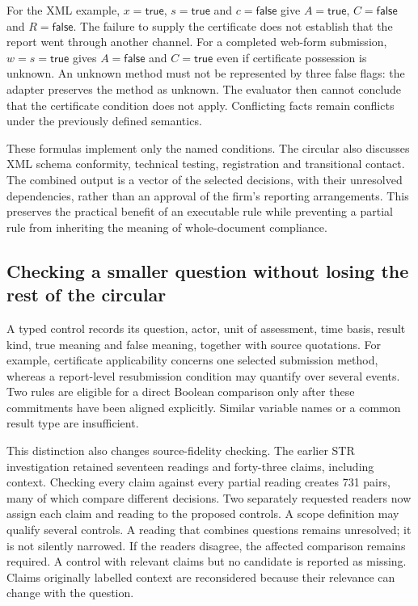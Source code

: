 For the XML example, $x=\mathsf{true}$, $s=\mathsf{true}$ and
$c=\mathsf{false}$ give $A=\mathsf{true}$, $C=\mathsf{false}$ and
$R=\mathsf{false}$. The failure to supply the certificate does not establish
that the report went through another channel. For a completed web-form
submission, $w=s=\mathsf{true}$ gives $A=\mathsf{false}$ and
$C=\mathsf{true}$ even if certificate possession is unknown. An unknown method
must not be represented by three false flags: the adapter preserves the method
as unknown. The evaluator then cannot conclude that the certificate condition
does not apply. Conflicting facts remain conflicts under the previously defined
semantics.

These formulas implement only the named conditions. The circular also discusses
XML schema conformity, technical testing, registration and transitional contact.
The combined output is a vector of the selected decisions, with their unresolved
dependencies, rather than an approval of the firm's reporting arrangements.
This preserves the practical benefit of an executable rule while preventing a
partial rule from inheriting the meaning of whole-document compliance.

\subsection{Checking a smaller question without losing the rest of the circular}

A typed control records its question, actor, unit of assessment, time basis,
result kind, true meaning and false meaning, together with source quotations.
For example, certificate applicability concerns one selected submission method,
whereas a report-level resubmission condition may quantify over several events.
Two rules are eligible for a direct Boolean comparison only after these
commitments have been aligned explicitly. Similar variable names or a common
result type are insufficient.

This distinction also changes source-fidelity checking. The earlier STR
investigation retained seventeen readings and forty-three claims, including
context. Checking every claim against every partial reading creates 731 pairs,
many of which compare different decisions. Two separately requested readers now
assign each claim and reading to the proposed controls. A scope definition may
qualify several controls. A reading that combines questions remains unresolved;
it is not silently narrowed. If the readers disagree, the affected comparison
remains required. A control with relevant claims but no candidate is reported
as missing. Claims originally labelled context are reconsidered because their
relevance can change with the question.

